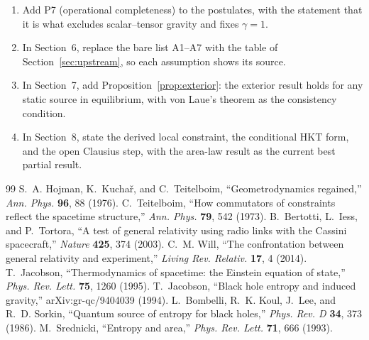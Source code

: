 \documentclass[11pt]{article}
\theoremstyle{plain}
\theoremstyle{definition}
\theoremstyle{remark}
\begin{document}
\begin{enumerate}[1.]
\item Add P7 (operational completeness) to the postulates, with the statement that it is what excludes scalar--tensor gravity and fixes $\gamma=1$.
\item In Section~6, replace the bare list A1--A7 with the table of Section~\ref{sec:upstream}, so each assumption shows its source.
\item In Section~7, add Proposition~\ref{prop:exterior}: the exterior result holds for any static source in equilibrium, with von Laue's theorem as the consistency condition.
\item In Section~8, state the derived local constraint, the conditional HKT form, and the open Clausius step, with the area-law result as the current best partial result.
\end{enumerate}

\begin{thebibliography}{99}
S.~A. Hojman, K.~Kucha\v{r}, and C.~Teitelboim, ``Geometrodynamics regained,'' \emph{Ann. Phys.} \textbf{96}, 88 (1976).
C.~Teitelboim, ``How commutators of constraints reflect the spacetime structure,'' \emph{Ann. Phys.} \textbf{79}, 542 (1973).
B.~Bertotti, L.~Iess, and P.~Tortora, ``A test of general relativity using radio links with the Cassini spacecraft,'' \emph{Nature} \textbf{425}, 374 (2003).
C.~M. Will, ``The confrontation between general relativity and experiment,'' \emph{Living Rev. Relativ.} \textbf{17}, 4 (2014).
T.~Jacobson, ``Thermodynamics of spacetime: the Einstein equation of state,'' \emph{Phys. Rev. Lett.} \textbf{75}, 1260 (1995).
T.~Jacobson, ``Black hole entropy and induced gravity,'' arXiv:gr-qc/9404039 (1994).
L.~Bombelli, R.~K. Koul, J.~Lee, and R.~D. Sorkin, ``Quantum source of entropy for black holes,'' \emph{Phys. Rev. D} \textbf{34}, 373 (1986).
M.~Srednicki, ``Entropy and area,'' \emph{Phys. Rev. Lett.} \textbf{71}, 666 (1993).
\end{thebibliography}
\end{document}
